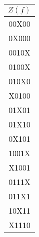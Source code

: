 \documentclass{article}
\begin{document}
\begin{center}
\begin{tabular}[t]{|lcc|}
\end{tabular}
\begin{tabular}[t]{|c|}
\hline $Z(f)$ \\ \hline
00X00\\
0X000\\
0010X\\
0100X\\
010X0\\
X0100\\
01X01\\
01X10\\
0X101\\
1001X\\
X1001\\
0111X\\
011X1\\
10X11\\
X1110\\
\hline \end{tabular}
\end{center}
\end{document}
